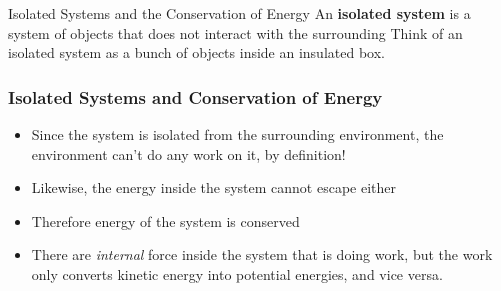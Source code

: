 \documentclass[12pt,compress,aspectratio=169]{beamer}
\newcommand{\eq}[2]{\vspace{#1}{\Large\begin{displaymath}#2\end{displaymath}}}
\begin{document}
%
%
%  
%
%




\begin{frame}{Isolated Systems and the Conservation of Energy}
  An \textbf{isolated system} is a system of objects that does not interact with
  the surrounding
    Think of an isolated system as a bunch of objects inside an insulated box.
  \begin{center}
  \end{center}
\end{frame}


\begin{frame}
  \frametitle{Isolated Systems and Conservation of Energy}
  \begin{itemize}
  \item Since the system is isolated from the surrounding environment, the
    environment can't do any work on it, by definition!
  \item Likewise, the energy inside the system cannot escape either
  \item Therefore energy of the system is conserved
  \item There are \emph{internal} force inside the system that is doing work,
    but the work only converts kinetic energy into potential energies, and vice
    versa.
  \end{itemize}
\end{frame}
\end{document}
